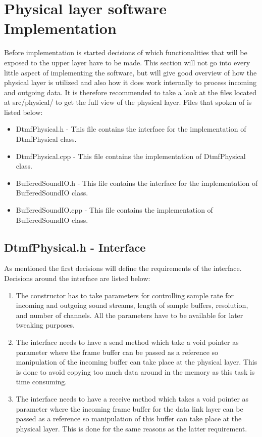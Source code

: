 \section{Physical layer software Implementation}
Before implementation is started decisions of which functionalities that will be exposed to the upper layer have to be made. This section will not go into every little aspect of implementing the software, but will give good overview of how the physical layer is utilized and also how it does work internally to process incoming and outgoing data. It is therefore recommended to take a look at the files located at src/physical/ to get the full view of the physical layer. Files that spoken of is listed below:

\begin {itemize}
\item DtmfPhysical.h - This file contains the interface for the implementation of DtmfPhysical class.
\item DtmfPhysical.cpp - This file contains the implementation of DtmfPhysical class.
\item BufferedSoundIO.h - This file contains the interface for the implementation of BufferedSoundIO class.
\item BufferedSoundIO.cpp - This file contains the implementation of BufferedSoundIO class.
\end{itemize}

	\subsection{DtmfPhysical.h - Interface}
	As mentioned the first decisions will define the requirements of the interface. Decisions around the interface are listed below:
	\begin {enumerate}
	\item The constructor has to take parameters for controlling sample rate for incoming and outgoing sound streams, length of sample buffers,
	resolution, and number of channels. All the parameters have to be available for later tweaking purposes.
	\item The interface needs to have a send method which take a void pointer as parameter where the frame buffer can be passed as a reference
	so manipulation of the incoming buffer can take place at the physical layer. This is done to avoid copying too much data around in the memory as this task is time consuming.
	\item The interface needs to have a receive method which takes a void pointer as parameter where the incoming frame buffer for the data link
	layer can be passed as a reference so manipulation of this buffer can take place at the physical layer. This is done for the same reasons as the latter requirement.
	\end{enumerate}
	

